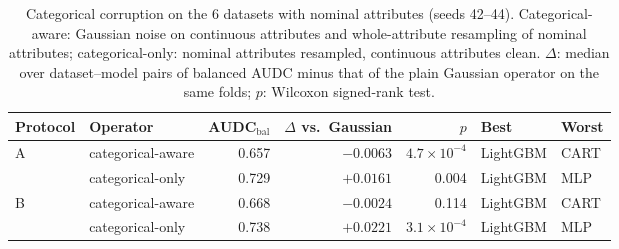 \begin{table}[t]
\centering
\footnotesize
\caption{Categorical corruption on the 6 datasets with nominal attributes (seeds 42--44). Categorical-aware: Gaussian noise on continuous attributes and whole-attribute resampling of nominal attributes; categorical-only: nominal attributes resampled, continuous attributes clean. $\Delta$: median over dataset--model pairs of balanced AUDC minus that of the plain Gaussian operator on the same folds; $p$: Wilcoxon signed-rank test.}
\label{tab:categorical}
\begin{tabular}{@{}llrrrll@{}}
\toprule
Protocol & Operator & AUDC$_{\mathrm{bal}}$ & $\Delta$ vs.\ Gaussian & $p$ & Best & Worst \\
\midrule
A & categorical-aware & 0.657 & $-0.0063$ & $4.7\times10^{-4}$ & LightGBM & CART \\
 & categorical-only & 0.729 & $+0.0161$ & 0.004 & LightGBM & MLP \\
B & categorical-aware & 0.668 & $-0.0024$ & 0.114 & LightGBM & CART \\
 & categorical-only & 0.738 & $+0.0221$ & $3.1\times10^{-4}$ & LightGBM & MLP \\
\bottomrule
\end{tabular}
\end{table}
